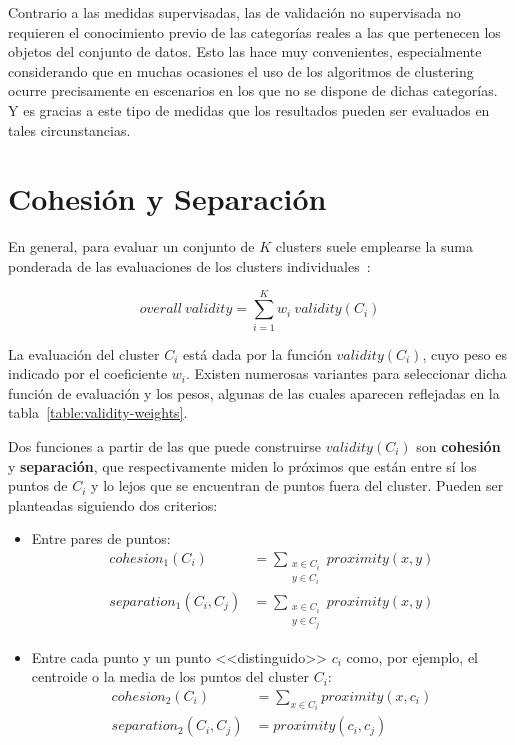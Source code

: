 Contrario a las medidas supervisadas, las de validación no supervisada no requieren el conocimiento previo de las categorías reales a las que pertenecen los objetos del conjunto de datos.
Esto las hace muy convenientes, especialmente considerando que en muchas ocasiones el uso de los algoritmos de clustering ocurre precisamente en escenarios en los que no se dispone de dichas categorías.
Y es gracias a este tipo de medidas que los resultados pueden ser evaluados en tales circunstancias.

\section{Cohesión y Separación}\label{sec:cohesiónYSeparación}

En general, para evaluar un conjunto de $K$ clusters suele emplearse la suma ponderada de las evaluaciones de los clusters individuales~\cite{Tan05}:

\begin{equation}
    \label{eq:overall-validity}
    overall\ validity = \sum_{i=1}^{K}{w_i\ validity(C_i)}
\end{equation}

La evaluación del cluster $C_i$ está dada por la función $validity(C_i)$, cuyo peso es indicado por el coeficiente $w_i$.
Existen numerosas variantes para seleccionar dicha función de evaluación y los pesos, algunas de las cuales aparecen reflejadas en la tabla~\ref{table:validity-weights}.

Dos funciones a partir de las que puede construirse $validity(C_i)$ son \textbf{cohesión} y \textbf{separación}, que respectivamente miden lo próximos que están entre sí los puntos de $C_i$ y lo lejos que se encuentran de puntos fuera del cluster.
Pueden ser planteadas siguiendo dos criterios:

\begin{itemize}
    \item Entre pares de puntos:
    \begin{align}
        cohesion_1(C_i) & = \sum_{\substack{x\in C_i \\ y\in C_i}}{proximity(x,y)} \\
        separation_1(C_i, C_j) & = \sum_{\substack{x\in C_i \\ y\in C_j}}{proximity(x,y)}
    \end{align}

    \item Entre cada punto y un punto <<distinguido>> $c_i$ como, por ejemplo, el centroide o la media de los puntos del cluster $C_i$:
    \begin{align}
        \label{eq:selected-point-cohesion}
        cohesion_2(C_i) & = \sum_{x\in C_i}{proximity(x,c_i)} \\
        \label{eq:selected-point-separation}
        separation_2(C_i, C_j) & = proximity(c_i,c_j)
    \end{align}
\end{itemize}

